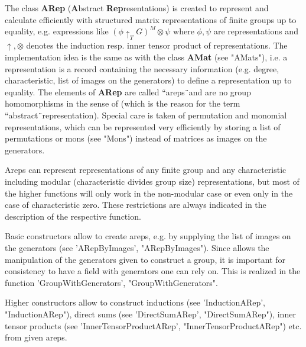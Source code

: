 The class {\bf ARep} ({\bf A}bstract {\bf Rep}resentations) is 
created to represent and calculate efficiently with structured 
matrix representations of finite groups up to equality, e.g.  
expressions like 
$(\phi\uparrow_T G)^M\otimes\psi$ where $\phi, \psi$ are
representations and $\uparrow, \otimes$ denotes the induction 
resp. inner tensor product of representations. 
The implementation idea is the same as with the class 
{\bf AMat} (see "AMats"), i.e. a representation is a record 
containing the necessary information
(e.g. degree, characteristic, list of images on the generators)
to define a representation up to equality. 
The elements of {\bf ARep} are called ``areps\"\ 
and are no group homomorphisms in the sense of {\GAP} (which is 
the reason for the term ``abstract\"\ representation). 
Special care is taken of permutation and monomial representations,
which can be represented very efficiently by storing a list of 
permutations or mons (see "Mons") instead of matrices as 
images on the generators.

Areps can represent representations of any finite group and any
characteristic including modular (characteristic divides group size)
representations, but most of the higher functions will only work 
in the non-modular case or even only in the case of characteristic zero.
These restrictions are always indicated in the description of the
respective function.

Basic constructors allow to create areps, e.g. by supplying
the list of images on the generators (see 'ARepByImages', 
"ARepByImages"). Since {\GAP} allows the manipulation of 
the generators given to construct a group, it is important
for consistency to have a field with generators one can rely on.
This is realized in the function 'GroupWithGenerators', 
"GroupWithGenerators".

Higher constructors allow to construct inductions (see 'InductionARep',
"InductionARep"), direct sums (see 'DirectSumARep', "DirectSumARep"), 
inner tensor products (see 'InnerTensorProductARep',
"InnerTensorProductARep") etc. from given areps.

